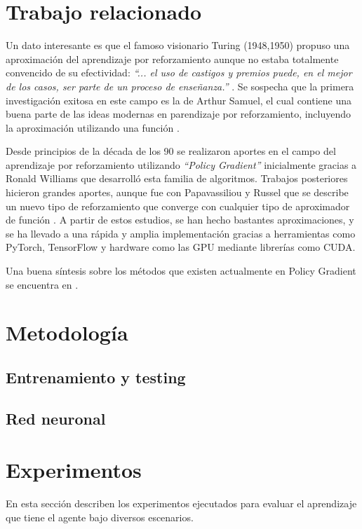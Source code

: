 \documentclass[journal]{IEEEtran}
\begin{document}
\section{Trabajo relacionado}
Un dato interesante es que el famoso visionario Turing (1948,1950) propuso una aproximación del aprendizaje por reforzamiento aunque no estaba totalmente convencido de su efectividad: \emph{``... el uso de castigos y premios puede, en el mejor de los casos, ser parte de un proceso de enseñanza.''} \cite{Turing1948,Turing1950}. Se sospecha que la primera investigación exitosa en este campo es la de Arthur Samuel, el cual contiene una buena parte de las ideas modernas en parendizaje por reforzamiento, incluyendo la aproximación utilizando una función \cite{Rusell2010}.

Desde principios de la década de los 90 se realizaron aportes en el campo del aprendizaje por reforzamiento utilizando \emph{``Policy Gradient''} inicialmente gracias a Ronald Williams que desarrolló esta familia de algoritmos. Trabajos posteriores hicieron grandes aportes, aunque fue con Papavassiliou y Russel que se describe un nuevo tipo de reforzamiento que converge con cualquier tipo de aproximador de función \cite{Papavassiliou1999}. A partir de estos estudios, se han hecho bastantes aproximaciones, y se ha llevado a una rápida y amplia implementación gracias a herramientas como PyTorch, TensorFlow y hardware como las GPU mediante librerías como CUDA.

Una buena síntesis sobre los métodos que existen actualmente en Policy Gradient se encuentra en \cite{Peters2010}.



\section{Metodología}


\subsection{Entrenamiento y testing}


\subsection{Red neuronal}


\section{Experimentos}
En esta sección describen los experimentos ejecutados para evaluar el aprendizaje que tiene el agente bajo diversos escenarios.
\end{document}
